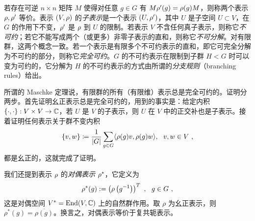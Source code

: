 
若存在可逆 $n\times n$ 矩阵 $M$ 使得对任意 $g\in G$ 有 $M\rho'(g)=\rho(g)M$，则称两个表示 $\rho,\rho'$ 等价。表示 $(V,\rho)$ 的\emph{子表示}是一个表示 $(U,\rho')$，其中 $U$ 是子空间 $U\subset V$，在 $G$ 的作用下不变，$\rho'$ 是 $\rho$ 到 $U$ 的限制。若表示 $V$ 不含任何真子表示，则称它\emph{不可约}；若它不能写成两个（或更多）非零子表示的直和，则称它\emph{不可分解}。对有限群，这两个概念一致。若一个表示是有限多个不可约表示的直和，即它可完全分解为不可约的部分，则称它\emph{完全可约}。$G$ 的不可约表示在限制到子群 $H<G$ 时可以变为可约的，它分解为 $H$ 的不可约表示的方式由所谓的\emph{分支规则}（branching rules）给出。

所谓的 Maschke 定理说，有限群的所有（有限维）表示总是完全可约的。证明分两步。首先证明幺正表示总是完全可约的，用到的事实是：给定内积 $\lbrace\cdot,\cdot\rbrace: V\times V \to \mathbb{C}$，若 $U$ 是 $V$ 的子表示，则 $U$ 在 $V$ 中的正交补也是子表示。接着证明任何表示关于群不变内积
\begin{equation}
\lbrace v,w\rbrace\coloneqq\frac{1}{| G|}\sum_{g\in G}\langle\rho(g)v,\rho(g)w\rangle,~~v,w\in V~,
\end{equation}
都是幺正的，这就完成了证明。


我们还提到表示 $\rho$ 的\emph{对偶表示} $\rho^*$，它定义为
\begin{equation}
\label{eq:dual_rep}
\rho^*(g):=\left(\rho\left(g^{-1}\right)\right)^T~,~~g\in G~, 
\end{equation}
这是对偶空间 $V^*=\operatorname{\text{End}}(V,\mathbb{C})$ 上的自然群作用。取 $\rho$ 为幺正表示，则 $\rho^*(g)=\overline{\rho(g)}$。换言之，对偶表示等价于复共轭表示。


